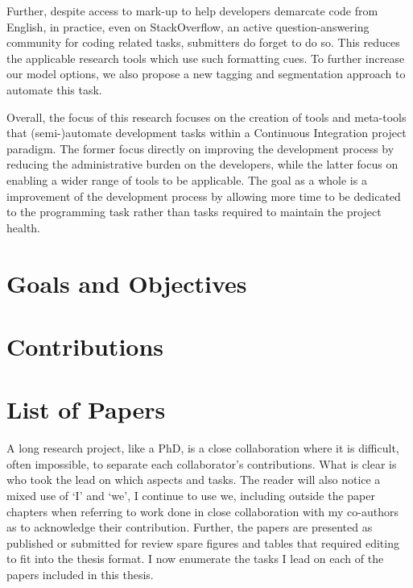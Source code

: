 Further, despite access to mark-up to help developers demarcate code from
English, in practice, even on StackOverflow, an active question-answering
community for coding related tasks, submitters do forget to do so. This reduces
the applicable research tools which use such formatting cues. To further
increase our model options, we also propose a new tagging and segmentation
approach to automate this task.

Overall, the focus of this research focuses on the creation of tools and
meta-tools that (semi-)automate development tasks within a Continuous
Integration project paradigm. The former focus directly on improving the
development process by reducing the administrative burden on the developers,
while the latter focus on enabling a wider range of tools to be applicable. The
goal as a whole is a improvement of the development process by allowing more
time to be dedicated to the programming task rather than tasks required to
maintain the project health.

\section{Goals and Objectives}
\label{chapter:introduction:sec:goals}


\section{Contributions}
\label{chapter:introduction:sec:contrib}


\section{List of Papers}
\label{chapter:introduction:sec:papers}

A long research project, like a PhD, is a close collaboration where it is
difficult, often impossible, to separate each collaborator's contributions. What
is clear is who took the lead on which aspects and tasks. The reader will also
notice a mixed use of `I' and `we', I continue to use we, including outside the
paper chapters when referring to work done in close collaboration with my
co-authors as to acknowledge their contribution. Further, the papers are
presented as published or submitted for review spare figures and tables that
required editing to fit into the thesis format. I now enumerate the tasks I lead
on each of the papers included in this thesis.

